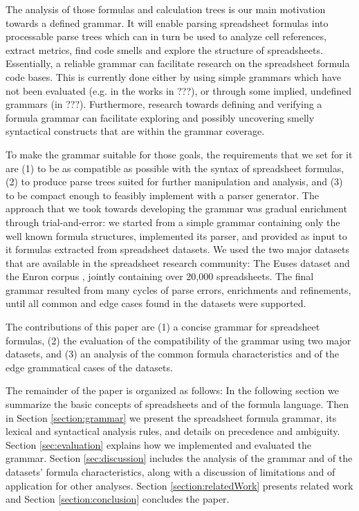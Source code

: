 \documentclass[conference]{IEEEtran}
\begin{document}
The analysis of those formulas and calculation trees is our main motivation towards a defined grammar. It will enable parsing spreadsheet formulas into processable parse trees which can in turn be used to analyze cell references, extract metrics, find code smells and explore the structure of spreadsheets. Essentially, a reliable grammar can facilitate research on the spreadsheet formula code bases. This is currently done either by using simple grammars which have not been evaluated (e.g. in the works in ???), or through some implied, undefined grammars (in ???). Furthermore, research towards defining and verifying a formula grammar can facilitate exploring and possibly uncovering smelly syntactical constructs that are within the grammar coverage.

To make the grammar suitable for those goals, the requirements that we set for it are (1) to be as compatible as possible with the syntax of spreadsheet formulas, (2) to produce parse trees suited for further manipulation and analysis, and (3) to be compact enough to feasibly implement with a parser generator. The approach that we took towards developing the grammar was gradual enrichment through trial-and-error: we started from a simple grammar containing only the well known formula structures, implemented its parser, and provided as input to it formulas extracted from spreadsheet datasets. We used the two major datasets that are available in the spreadsheet research community: The Euses dataset \cite{euses} and the Enron corpus \cite{enron}, jointly containing over 20,000 spreadsheets. The final grammar resulted from many cycles of parse errors, enrichments and refinements, until all common and edge cases found in the datasets were supported.

The contributions of this paper are (1) a concise grammar for spreadsheet formulas, (2) the evaluation of the compatibility of the grammar using two major datasets, and (3) an analysis of the common formula characteristics and of the edge grammatical cases of the datasets.

The remainder of the paper is organized as follows: In the following section we summarize the basic concepts of spreadsheets and of the formula language. Then in Section \ref{section:grammar} we present the spreadsheet formula grammar, its lexical and syntactical analysis rules, and details on precedence and ambiguity. Section \ref{sec:evaluation} explains how we implemented and evaluated the grammar. Section \ref{sec:discussion} includes the analysis of the grammar and of the datasets' formula characteristics, along with a discussion of limitations and of application for other analyses. Section \ref{section:relatedWork} presents related work and Section \ref{section:conclusion} concludes the paper.
\end{document}
